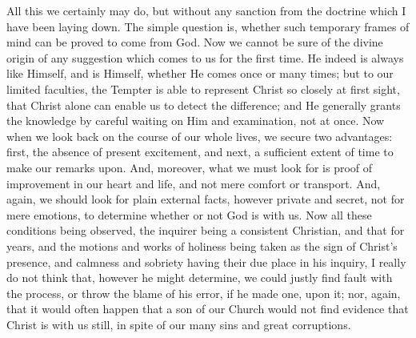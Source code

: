 All this we certainly may do, but without any sanction from the
doctrine which I have been laying down. The simple question is,
whether such temporary frames of mind can be proved to come from God.
Now we cannot be sure of the divine origin of any suggestion which
comes to us for the first time. He indeed is always like Himself, and
is Himself, whether He comes once or many times; but to our limited
faculties, the Tempter is able to represent Christ so closely at first
sight, that Christ alone can enable us to detect the difference; and
He generally grants the knowledge by careful waiting on Him and
examination, not at once. Now when we look back on the course of our
whole lives, we secure two advantages: first, the absence of present
excitement, and next, a sufficient extent of time to make our remarks
upon. And, moreover, what we must look for is proof of improvement in
our heart and life, and not mere comfort or transport. And, again, we
should look for plain external facts, however private and secret, not
for mere emotions, to determine whether or not God is with us. Now all
these conditions being observed, the inquirer being a consistent
Christian, and that for years, and the motions and works of holiness
being taken as the sign of Christ's presence, and calmness and
sobriety having their due place in his inquiry, I really do not think
that, however he might determine, we could justly find fault with the
process, or throw the blame of his error, if he made one, upon it;
nor, again, that it would often happen that a son of our Church would
not find evidence that Christ is with us still, in spite of our many
sins and great corruptions.

